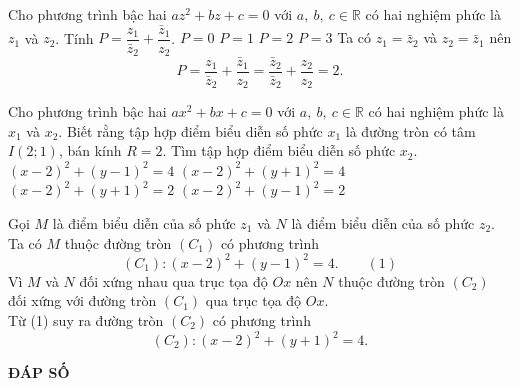 \begin{ex}%
	Cho phương trình bậc hai $az^2+bz+c=0$ với $a,~b,~c\in \mathbb{R}$ có hai nghiệm phức là $z_1$ và $z_2$. Tính $P=\dfrac{z_1}{\bar{z}_2}+\dfrac{\bar{z}_1}{z_2}$.
	\choice
	{$P=0$}
	{$P=1$}
	{\True $P=2$}
	{$P=3$}
	\loigiai
	{
		Ta có $z_1=\bar{z}_2$ và  $z_2=\bar{z}_1$ nên
		\[P=\dfrac{z_1}{\bar{z}_2}+\dfrac{\bar{z}_1}{z_2}=\dfrac{\bar{z}_2}{\bar{z}_2}+\dfrac{z_2}{z_2}=2.\]
	}
\end{ex}

\begin{ex}%
	Cho phương trình bậc hai $ax^2+bx+c=0$ với $a,~b,~c\in \mathbb{R}$ có hai nghiệm phức là $x_1$ và $x_2$. Biết rằng tập hợp điểm biểu diễn số phức $x_1$ là đường tròn có tâm $I(2;1)$, bán kính $R=2$. Tìm tập hợp điểm biểu diễn số phức $x_2$.
	\choice
	{$(x-2)^2+(y-1)^2=4$}
	{\True $(x-2)^2+(y+1)^2=4$}
	{$(x-2)^2+(y+1)^2=2$}
	{$(x-2)^2+(y-1)^2=2$}
	\loigiai
	{
		Gọi $M$ là điểm biểu diễn của số phức $z_1$ và $N$ là điểm biểu diễn của số phức $z_2$.\\
		Ta có $M$ thuộc đường tròn $(C_1)$ có phương trình
		\[(C_1)\colon(x-2)^2+(y-1)^2=4.\qquad(1)\]
		Vì $M$ và $N$ đối xứng nhau qua trục tọa độ $Ox$ nên $N$ thuộc đường tròn $(C_2)$ đối xứng với đường tròn $(C_1)$ qua trục tọa độ $Ox$.\\
		Từ (1) suy ra đường tròn $(C_2)$ có phương trình
		\[(C_2)\colon(x-2)^2+(y+1)^2=4.\]
		
	}
\end{ex}

\newpage 
\begin{center}
	\textbf{ĐÁP SỐ}
\end{center}
\begin{multicols}{10}
	\setlength{\columnseprule}{0pt}
	 
\end{multicols}
